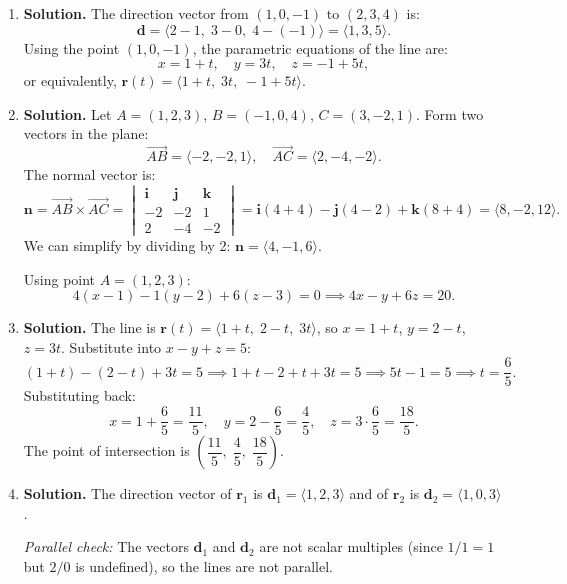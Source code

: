 \begin{enumerate}
\item \textbf{Solution.}
The direction vector from \( (1, 0, -1) \) to \( (2, 3, 4) \) is:
\[
\mathbf{d} = \langle 2 - 1,\; 3 - 0,\; 4 - (-1) \rangle = \langle 1, 3, 5 \rangle.
\]
Using the point \( (1, 0, -1) \), the parametric equations of the line are:
\[
x = 1 + t, \quad y = 3t, \quad z = -1 + 5t,
\]
or equivalently, \( \mathbf{r}(t) = \langle 1 + t,\; 3t,\; -1 + 5t \rangle \).

\item \textbf{Solution.}
Let \( A = (1, 2, 3) \), \( B = (-1, 0, 4) \), \( C = (3, -2, 1) \). Form two vectors in the plane:
\[
\overrightarrow{AB} = \langle -2, -2, 1 \rangle, \quad \overrightarrow{AC} = \langle 2, -4, -2 \rangle.
\]
The normal vector is:
\[
\mathbf{n} = \overrightarrow{AB} \times \overrightarrow{AC} = \begin{vmatrix} \mathbf{i} & \mathbf{j} & \mathbf{k} \\ -2 & -2 & 1 \\ 2 & -4 & -2 \end{vmatrix} = \mathbf{i}(4 + 4) - \mathbf{j}(4 - 2) + \mathbf{k}(8 + 4) = \langle 8, -2, 12 \rangle.
\]
We can simplify by dividing by 2: \( \mathbf{n} = \langle 4, -1, 6 \rangle \).

Using point \( A = (1, 2, 3) \):
\[
4(x - 1) - 1(y - 2) + 6(z - 3) = 0 \implies 4x - y + 6z = 20.
\]

\item \textbf{Solution.}
The line is \( \mathbf{r}(t) = \langle 1 + t,\; 2 - t,\; 3t \rangle \), so \( x = 1 + t \), \( y = 2 - t \), \( z = 3t \). Substitute into \( x - y + z = 5 \):
\[
(1 + t) - (2 - t) + 3t = 5 \implies 1 + t - 2 + t + 3t = 5 \implies 5t - 1 = 5 \implies t = \frac{6}{5}.
\]
Substituting back:
\[
x = 1 + \frac{6}{5} = \frac{11}{5}, \quad y = 2 - \frac{6}{5} = \frac{4}{5}, \quad z = 3 \cdot \frac{6}{5} = \frac{18}{5}.
\]
The point of intersection is \( \left(\dfrac{11}{5},\; \dfrac{4}{5},\; \dfrac{18}{5}\right) \).

\item \textbf{Solution.}
The direction vector of \( \mathbf{r}_1 \) is \( \mathbf{d}_1 = \langle 1, 2, 3 \rangle \) and of \( \mathbf{r}_2 \) is \( \mathbf{d}_2 = \langle 1, 0, 3 \rangle \).

\textit{Parallel check:} The vectors \( \mathbf{d}_1 \) and \( \mathbf{d}_2 \) are not scalar multiples (since \( 1/1 = 1 \) but \( 2/0 \) is undefined), so the lines are not parallel.


\end{enumerate}
